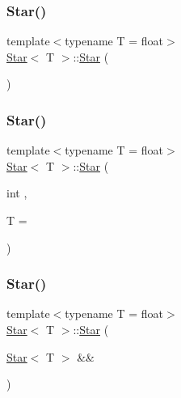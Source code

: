 \mbox{\label{classStar_a4be07c82320f781071409294614df4ae}} 
\subsubsection{\texorpdfstring{Star()}{Star()}\hspace{0.1cm}{\footnotesize\ttfamily [5/8]}}
{\footnotesize\ttfamily template$<$typename T  = float$>$ \\
\mbox{\hyperlink{classStar}{Star}}$<$ T $>$\+::\mbox{\hyperlink{classStar}{Star}} (\begin{DoxyParamCaption}{ }\end{DoxyParamCaption})}

\mbox{\label{classStar_aa179936ed93e38e70992cb4f6e3cbff3}} 
\subsubsection{\texorpdfstring{Star()}{Star()}\hspace{0.1cm}{\footnotesize\ttfamily [6/8]}}
{\footnotesize\ttfamily template$<$typename T  = float$>$ \\
\mbox{\hyperlink{classStar}{Star}}$<$ T $>$\+::\mbox{\hyperlink{classStar}{Star}} (\begin{DoxyParamCaption}\item[{int}]{,  }\item[{T}]{ = {} }\end{DoxyParamCaption})}

\mbox{\label{classStar_af518471484341cad6b47ad42d4e637fe}} 
\subsubsection{\texorpdfstring{Star()}{Star()}\hspace{0.1cm}{\footnotesize\ttfamily [7/8]}}
{\footnotesize\ttfamily template$<$typename T  = float$>$ \\
\mbox{\hyperlink{classStar}{Star}}$<$ T $>$\+::\mbox{\hyperlink{classStar}{Star}} (\begin{DoxyParamCaption}\item[{\mbox{\hyperlink{classStar}{Star}}$<$ T $>$ \&\&}]{ }\end{DoxyParamCaption})\hspace{0.3cm}{\ttfamily [default]}}

